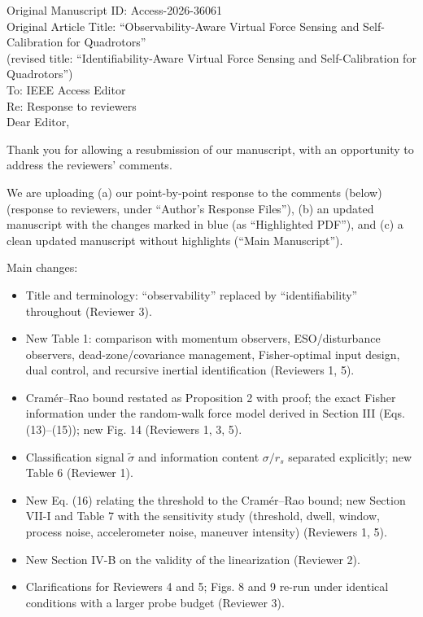 \documentclass[11pt]{article}
\begin{document}
Original Manuscript ID: Access-2026-36061\\
Original Article Title: ``Observability-Aware Virtual Force Sensing and Self-Calibration for Quadrotors''\\
(revised title: ``Identifiability-Aware Virtual Force Sensing and Self-Calibration for Quadrotors'')\\

To: IEEE Access Editor\\
Re: Response to reviewers\\

Dear Editor,

Thank you for allowing a resubmission of our manuscript, with an opportunity to address the reviewers' comments.

We are uploading (a) our point-by-point response to the comments (below) (response to reviewers, under ``Author's Response Files''), (b) an updated manuscript with the changes marked in blue (as ``Highlighted PDF''), and (c) a clean updated manuscript without highlights (``Main Manuscript'').

Main changes:
\begin{itemize}[leftmargin=1.4em]
\item Title and terminology: ``observability'' replaced by ``identifiability'' throughout (Reviewer 3).
\item New Table 1: comparison with momentum observers, ESO/disturbance observers, dead-zone/covariance management, Fisher-optimal input design, dual control, and recursive inertial identification (Reviewers 1, 5).
\item Cram\'er--Rao bound restated as Proposition 2 with proof; the exact Fisher information under the random-walk force model derived in Section III (Eqs. (13)--(15)); new Fig. 14 (Reviewers 1, 3, 5).
\item Classification signal $\tilde\sigma$ and information content $\sigma/r_s$ separated explicitly; new Table 6 (Reviewer 1).
\item New Eq. (16) relating the threshold to the Cram\'er--Rao bound; new Section VII-I and Table 7 with the sensitivity study (threshold, dwell, window, process noise, accelerometer noise, maneuver intensity) (Reviewers 1, 5).
\item New Section IV-B on the validity of the linearization (Reviewer 2).
\item Clarifications for Reviewers 4 and 5; Figs. 8 and 9 re-run under identical conditions with a larger probe budget (Reviewer 3).
\end{itemize}
\end{document}
